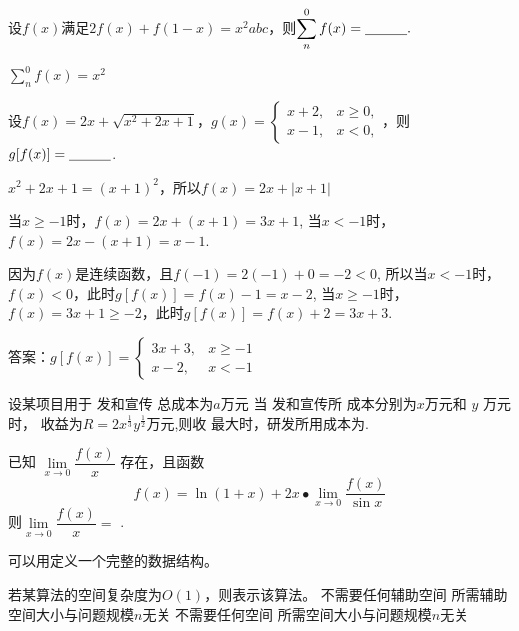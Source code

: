 \documentclass[standard, analysis]{ExBook}
\begin{document}
\begin{qitems}[showanalysis]

    \begin{bbox}
        \qitem 设$f(x)$满足$2f(x)+f(1-x)=x^2 abc$，则$ \displaystyle\sum \limits_{n}^{0}f(x)=\underline{\hspace{3em}}.$
        \begin{analysis}
            $\displaystyle\sum \limits_{n}^{0}f(x)=x^2$
        \end{analysis}
    \end{bbox}
    

    \begin{bbox}
        \qitem[][]   设$f(x)=2x+\sqrt{x^{2}+2x+1}$，$g(x)=
        \begin{cases}
        x+2, & x\geqslant0, \\
        x-1, & x<0,  
        \end{cases}$，则$g[f(x)]= \underline{\hspace{3em}}$.
        \begin{analysis}[\underline{答案}：]
            $x^2+2x+1=(x+1)^2$，所以$f(x)=2x+|x+1|$

            当$x\geq -1$时，$f(x)=2x+(x+1)=3x+1$,
            当$x<-1$时，$f(x)=2x-(x+1)=x-1$.
            
            因为$f(x)$是连续函数，且$f(-1)=2(-1)+0=-2<0$,
            所以当$x<-1$时，$f(x)<0$，此时$g[f(x)]=f(x)-1=x-2$,
            当$x\geq -1$时，$f(x)=3x+1\geq -2$，此时$g[f(x)]=f(x)+2=3x+3$.
            
            答案：$g[f(x)]=
            \begin{cases}
            3x+3, & x\geq -1 \\
            x-2, & x<-1
            \end{cases}$
        \end{analysis}
    \end{bbox}

    \begin{bbox}
        \qitem   设某项目用于 发和宣传 总成本为$a$万元 当 发和宣传所 成本分别为$x$万元和 $y$ 万元时， 收益为$R=2x^{\frac{1}{3}}y^{\frac{1}{2}}$万元,则收 最大时，研发所用成本为\blankline.
    \end{bbox}

    \begin{bbox}
        \qitem   已知 $\lim\limits_{x\to0}\dfrac{f(x)}{x}$ 存在，且函数
        $$f(x)=\ln(1+x)+2x\bullet\lim_{x\to0}\frac{f(x)}{\sin x}$$
        则$\lim\limits_{x\to0}\dfrac{f(x)}{x}=$ \blankline.
    \end{bbox}

    \begin{bbox}
        \qitem  可以用\blankbox 定义一个完整的数据结构。\textwater
    \end{bbox}

    \begin{bbox}
        \qitem   若某算法的空间复杂度为$O(1)$，则表示该算法\blankbox 。
        \fourchoices
        {不需要任何辅助空间}
        {所需辅助空间大小与问题规模$n$无关}
        {不需要任何空间}
        {所需空间大小与问题规模$n$无关}
    \end{bbox}
\end{qitems}
\end{document}
